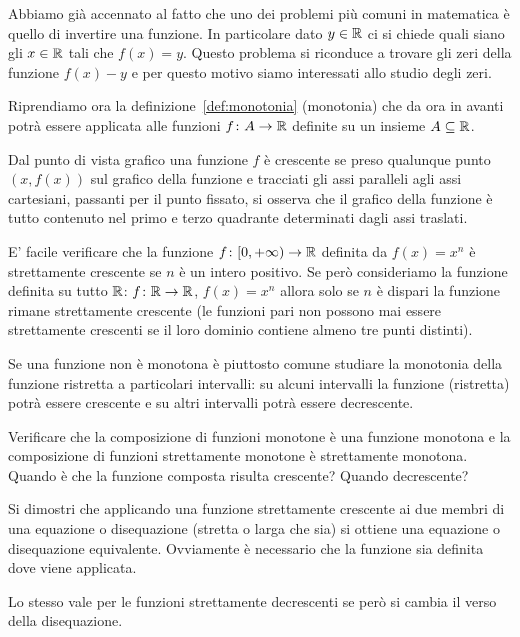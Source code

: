 Abbiamo già accennato al fatto che uno dei problemi più comuni in
matematica è quello di invertire una funzione. In particolare 
dato $y\in {\mathbb R}$ ci si chiede quali siano gli $x\in {\mathbb R}$ 
tali che $f(x)=y$. 
Questo problema si riconduce
a trovare gli zeri della funzione $f(x)-y$ e per questo motivo 
siamo interessati allo studio degli zeri.

Riprendiamo ora la definizione~\ref{def:monotonia} (monotonia) che da ora in avanti 
potrà essere applicata alle funzioni $f\colon A \to {\mathbb R}$ definite 
su un insieme $A\subseteq {\mathbb R}$.

Dal punto di vista grafico una funzione $f$ è crescente
se preso qualunque punto $(x,f(x))$ sul grafico della funzione
e tracciati gli assi paralleli agli assi cartesiani, passanti
per il punto fissato, si osserva che il grafico della funzione
è tutto contenuto nel primo e terzo quadrante determinati
dagli assi traslati.

E' facile verificare che la funzione $f\colon [0,+\infty)\to {\mathbb R}$
definita da $f(x)=x^n$
è strettamente crescente se $n$ è un intero positivo.
Se però consideriamo la funzione definita su tutto
${\mathbb R}$: $f\colon {\mathbb R} \to {\mathbb R}$,
$f(x)=x^n$ allora solo se $n$ è dispari la funzione rimane
strettamente crescente
(le funzioni pari non possono mai essere strettamente crescenti se
il loro dominio contiene almeno tre punti distinti).

Se una funzione non è monotona è piuttosto comune studiare 
la monotonia della funzione ristretta a particolari intervalli: 
su alcuni intervalli la funzione (ristretta) potrà essere crescente e su altri 
intervalli potrà essere decrescente.

\begin{exercise}
Verificare che la composizione di funzioni monotone è una
funzione monotona e la composizione di funzioni strettamente
monotone è strettamente monotona.
Quando è che la funzione composta risulta crescente?
Quando decrescente?
\end{exercise}

\begin{exercise}
Si dimostri che applicando una funzione strettamente crescente ai due
membri di una equazione o disequazione (stretta o larga che sia)
si ottiene una equazione o disequazione equivalente.
Ovviamente è necessario che la funzione sia definita dove viene applicata.

Lo stesso vale per le funzioni strettamente decrescenti 
se però si cambia il verso della disequazione.
\end{exercise}

